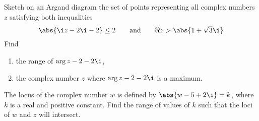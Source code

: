 \clearpage
\begin{problem}
    Sketch on an Argand diagram the set of points representing all complex numbers $z$ satisfying both inequalities
    \[
        \abs{\i z - 2\i - 2} \leq 2 \qquad \text{and} \qquad \Re{z} > \abs{1 + \sqrt3 \i}
    \]
    Find
    \begin{enumerate}
        \item the range of $\arg{z - 2 - 2\i}$,
        \item the complex number $z$ where $\arg{z - 2 - 2\i}$ is a maximum.
    \end{enumerate}

    The locus of the complex number $w$ is defined by $\abs{w - 5 + 2\i} = k$, where $k$ is a real and positive constant. Find the range of values of $k$ such that the loci of $w$ and $z$ will intersect.
\end{problem}
